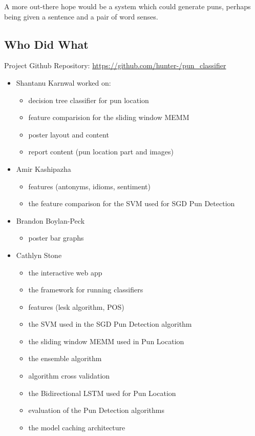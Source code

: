 \documentclass{article}
\begin{document}
A more out-there hope would be a system which could generate puns, perhaps being
given a sentence and a pair of word senses.

\subsection{Who Did What}

Project Github Repository: \url{https://github.com/hunter-/pun_classifier}

\begin{itemize}
\item Shantanu Karnwal worked on:
	\begin{itemize}
		\item decision tree classifier for pun location
		\item feature comparision for the sliding window MEMM
		\item poster layout and content
		\item report content (pun location part and images)
	\end{itemize}
\item Amir Kashipazha
	\begin{itemize}
		\item features (antonyms, idioms, sentiment)
		\item the feature comparison for the SVM used for SGD Pun Detection
	\end{itemize}
\item Brandon Boylan-Peck
	\begin{itemize}
		\item poster bar graphs
	\end{itemize}
\item Cathlyn Stone
	\begin{itemize}
		\item the interactive web app
		\item the framework for running classifiers
		\item features (lesk algorithm, POS)
		\item the SVM used in the SGD Pun Detection algorithm
		\item the sliding window MEMM used in Pun Location
		\item the ensemble algorithm
		\item algorithm cross validation
		\item the Bidirectional LSTM used for Pun Location
		\item evaluation of the Pun Detection algorithms
		\item the model caching architecture

\end{itemize}
\end{itemize}
\end{document}
